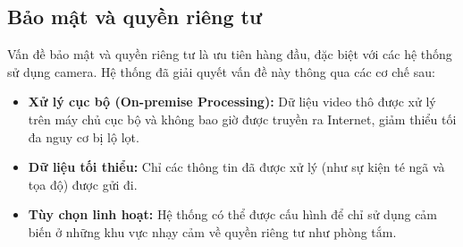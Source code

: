 \subsection{Bảo mật và quyền riêng tư}
Vấn đề bảo mật và quyền riêng tư là ưu tiên hàng đầu, đặc biệt với các hệ thống sử dụng camera. Hệ thống đã giải quyết vấn đề này thông qua các cơ chế sau:
\begin{itemize}
    \item \textbf{Xử lý cục bộ (On-premise Processing):} Dữ liệu video thô được xử lý trên máy chủ cục bộ và không bao giờ được truyền ra Internet, giảm thiểu tối đa nguy cơ bị lộ lọt.
    \item \textbf{Dữ liệu tối thiểu:} Chỉ các thông tin đã được xử lý (như sự kiện té ngã và tọa độ) được gửi đi.
    \item \textbf{Tùy chọn linh hoạt:} Hệ thống có thể được cấu hình để chỉ sử dụng cảm biến ở những khu vực nhạy cảm về quyền riêng tư như phòng tắm.
\end{itemize}
